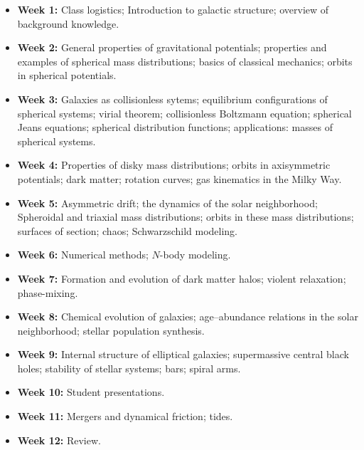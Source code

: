 \documentclass{article}
\begin{document}
\begin{itemize}

  \item {\bf Week 1:} Class logistics; Introduction to galactic
 structure; overview of background knowledge.

  \item {\bf Week 2:} General properties of gravitational potentials;
    properties and examples of spherical mass distributions; basics of
    classical mechanics; orbits in spherical potentials.

  \item {\bf Week 3:} Galaxies as collisionless sytems; equilibrium
    configurations of spherical systems; virial theorem; collisionless
    Boltzmann equation; spherical Jeans equations; spherical
    distribution functions; applications: masses of spherical systems.

  \item {\bf Week 4:} Properties of disky mass distributions; orbits
    in axisymmetric potentials; dark matter; rotation curves; gas
    kinematics in the Milky Way.

  \item {\bf Week 5:} Asymmetric drift; the dynamics of the solar
    neighborhood; Spheroidal and triaxial mass distributions; orbits
    in these mass distributions; surfaces of section; chaos;
    Schwarzschild modeling.

  \item {\bf Week 6:} Numerical methods; $N$-body modeling.

  \item {\bf Week 7:} Formation and evolution of dark matter halos;
    violent relaxation; phase-mixing.

  \item {\bf Week 8:} Chemical evolution of galaxies; age--abundance
    relations in the solar neighborhood; stellar population synthesis.

  \item {\bf Week 9:} Internal structure of elliptical galaxies;
    supermassive central black holes; stability of stellar systems; bars; spiral arms.

  \item {\bf Week 10:} Student presentations.

  \item {\bf Week 11:} Mergers and dynamical friction; tides.

  \item {\bf Week 12:} Review.

\end{itemize}
\end{document}
